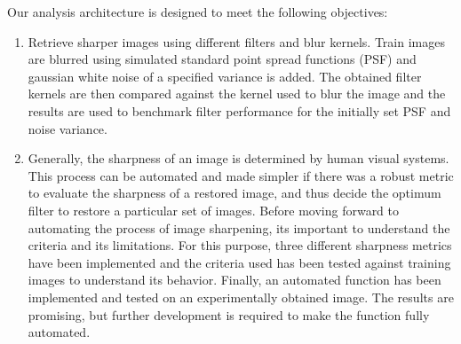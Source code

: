 \noindent Our analysis architecture is designed to meet the following objectives:
\begin{enumerate}
\item  Retrieve sharper images using different filters and blur kernels. Train images are blurred using simulated standard point spread functions (PSF) and gaussian white noise of a specified variance is added. The obtained filter kernels are then compared against the kernel used to blur the image and the results are used to benchmark filter performance for the initially set PSF and noise variance. 
\item Generally, the sharpness of an image is determined by human visual systems. This process can be automated and made simpler if there was a robust metric to evaluate the sharpness of a restored image, and thus decide the optimum filter to restore a particular set of images. Before moving forward to automating the process of image sharpening, its important to understand the criteria and its limitations. For this purpose, three different sharpness metrics have been implemented and the criteria used has been tested against training images to understand its behavior. Finally, an automated function has been implemented and tested on an experimentally obtained image. The results are promising, but further development is required to make the function fully automated.

\end{enumerate}